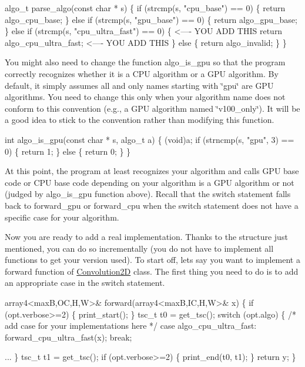\begin{DoxyCode}
algo\_t parse\_algo(const char * s) \{
  if (strcmp(s, "cpu\_base") == 0) \{
    return algo\_cpu\_base;
  \} else if (strcmp(s, "gpu\_base") == 0) \{
    return algo\_gpu\_base;
  \} else if (strcmp(s, "cpu\_ultra\_fast") == 0) \{  <---- YOU ADD THIS
    return algo\_cpu\_ultra\_fast;                   <---- YOU ADD THIS
  \} else \{
    return algo\_invalid;
  \}
\}
\end{DoxyCode}



\begin{DoxyItemize}
\item You might also need to change the function algo\+\_\+is\+\_\+gpu so that the program correctly recognizes whether it is a C\+PU algorithm or a G\+PU algorithm. By default, it simply assumes all and only names starting with \char`\"{}gpu\char`\"{} are G\+PU algorithms. You need to change this only when your algorithm name does not conform to this convention (e.\+g., a G\+PU algorithm named \char`\"{}v100\+\_\+only\char`\"{}). It will be a good idea to stick to the convention rather than modifying this function.
\end{DoxyItemize}


\begin{DoxyCode}
int algo\_is\_gpu(const char * s, algo\_t a) \{
  (void)a;
  if (strncmp(s, "gpu", 3) == 0) \{
    return 1;
  \} else \{ 
    return 0;
  \}
\}
\end{DoxyCode}


At this point, the program at least recognizes your algorithm and calls G\+PU base code or C\+PU base code depending on your algorithm is a G\+PU algorithm or not (judged by algo\+\_\+is\+\_\+gpu function above). Recall that the switch statement falls back to forward\+\_\+gpu or forward\+\_\+cpu when the switch statement does not have a specific case for your algorithm.

Now you are ready to add a real implementation. Thanks to the structure just mentioned, you can do so incrementally (you do not have to implement all functions to get your version used). To start off, let\textquotesingle{}s say you want to implement a forward function of \hyperlink{structConvolution2D}{Convolution2D} class. The first thing you need to do is to add an appropriate case in the switch statement.


\begin{DoxyCode}
array4<maxB,OC,H,W>& forward(array4<maxB,IC,H,W>& x) \{
  if (opt.verbose>=2) \{ print\_start(); \}
  tsc\_t t0 = get\_tsc();
  switch (opt.algo) \{
    /* add case for your implementations here */
  case algo\_cpu\_ultra\_fast:
    forward\_cpu\_ultra\_fast(x); break;

    ...
  \}
  tsc\_t t1 = get\_tsc();
  if (opt.verbose>=2) \{ print\_end(t0, t1); \}
  return y;
\}
\end{DoxyCode}


